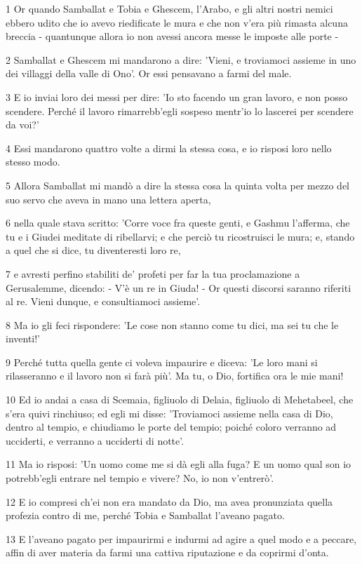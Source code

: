 \par 1 Or quando Samballat e Tobia e Ghescem, l'Arabo, e gli altri nostri nemici ebbero udito che io avevo riedificate le mura e che non v'era più rimasta alcuna breccia - quantunque allora io non avessi ancora messe le imposte alle porte -
\par 2 Samballat e Ghescem mi mandarono a dire: 'Vieni, e troviamoci assieme in uno dei villaggi della valle di Ono'. Or essi pensavano a farmi del male.
\par 3 E io inviai loro dei messi per dire: 'Io sto facendo un gran lavoro, e non posso scendere. Perché il lavoro rimarrebb'egli sospeso mentr'io lo lascerei per scendere da voi?'
\par 4 Essi mandarono quattro volte a dirmi la stessa cosa, e io risposi loro nello stesso modo.
\par 5 Allora Samballat mi mandò a dire la stessa cosa la quinta volta per mezzo del suo servo che aveva in mano una lettera aperta,
\par 6 nella quale stava scritto: 'Corre voce fra queste genti, e Gashmu l'afferma, che tu e i Giudei meditate di ribellarvi; e che perciò tu ricostruisci le mura; e, stando a quel che si dice, tu diventeresti loro re,
\par 7 e avresti perfino stabiliti de' profeti per far la tua proclamazione a Gerusalemme, dicendo: - V'è un re in Giuda! - Or questi discorsi saranno riferiti al re. Vieni dunque, e consultiamoci assieme'.
\par 8 Ma io gli feci rispondere: 'Le cose non stanno come tu dici, ma sei tu che le inventi!'
\par 9 Perché tutta quella gente ci voleva impaurire e diceva: 'Le loro mani si rilasseranno e il lavoro non si farà più'. Ma tu, o Dio, fortifica ora le mie mani!
\par 10 Ed io andai a casa di Scemaia, figliuolo di Delaia, figliuolo di Mehetabeel, che s'era quivi rinchiuso; ed egli mi disse: 'Troviamoci assieme nella casa di Dio, dentro al tempio, e chiudiamo le porte del tempio; poiché coloro verranno ad ucciderti, e verranno a ucciderti di notte'.
\par 11 Ma io risposi: 'Un uomo come me si dà egli alla fuga? E un uomo qual son io potrebb'egli entrare nel tempio e vivere? No, io non v'entrerò'.
\par 12 E io compresi ch'ei non era mandato da Dio, ma avea pronunziata quella profezia contro di me, perché Tobia e Samballat l'aveano pagato.
\par 13 E l'aveano pagato per impaurirmi e indurmi ad agire a quel modo e a peccare, affin di aver materia da farmi una cattiva riputazione e da coprirmi d'onta.
